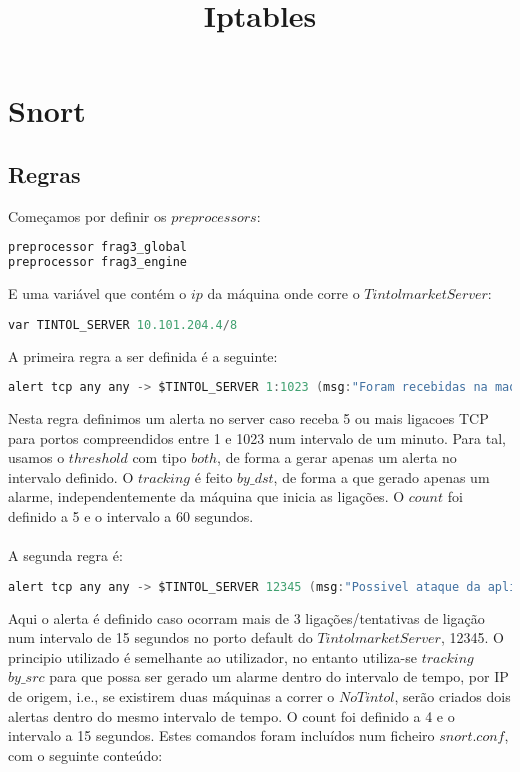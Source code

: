 \documentclass[10pt,a4paper]{report}
\title{\LARGE{Iptables}}
\date{}
\begin{document}
\chapter{Snort}
\section*{Regras}
Começamos por definir os $preprocessors$:
\begin{lstlisting}[language=Python]
preprocessor frag3_global
preprocessor frag3_engine
\end{lstlisting}
E uma variável que contém o $ip$ da máquina onde corre o $TintolmarketServer$:
\begin{lstlisting}[language=Python]
var TINTOL_SERVER 10.101.204.4/8
\end{lstlisting}
A primeira regra a ser definida é a seguinte:
\begin{lstlisting}[language=Java]
alert tcp any any -> $TINTOL_SERVER 1:1023 (msg:"Foram recebidas na maquina 5 ou mais ligacoes TCP para portos inferiores a 1024 num intervalo de um minuto";threshold:type both, track by_dst, count 5, seconds 60;sid:10001)
\end{lstlisting}
Nesta regra definimos um alerta no server caso receba 5 ou mais ligacoes TCP para portos compreendidos entre 1 e 1023 num intervalo de um minuto. Para tal, usamos o $threshold$ com tipo $both$, de forma a gerar apenas um alerta no intervalo definido. O $tracking$ é feito $by\_dst$, de forma a que gerado apenas um alarme, independentemente da máquina que inicia as ligações. O $count$ foi definido a 5 e o intervalo a 60 segundos.\\
\\
A segunda regra é:
\begin{lstlisting}[language=Java]
alert tcp any any -> $TINTOL_SERVER 12345 (msg:"Possivel ataque da aplicacao NoTintol"; threshold: type both, track by_src, count 4, seconds 15; sid:10002;)
\end{lstlisting}
Aqui o alerta é definido caso ocorram mais de 3 ligações/tentativas de ligação num intervalo de 15 segundos no porto default do $TintolmarketServer$, 12345. O principio utilizado é semelhante ao utilizador, no entanto utiliza-se $tracking$ $by\_src$ para que possa ser gerado um alarme dentro do intervalo de tempo, por IP de origem, i.e., se existirem duas máquinas a correr o $NoTintol$, serão criados dois alertas dentro do mesmo intervalo de tempo. O count foi definido a 4 e o intervalo a 15 segundos.
\clearpage
Estes comandos foram incluídos num ficheiro $snort.conf$, com o seguinte conteúdo:
\end{document}
